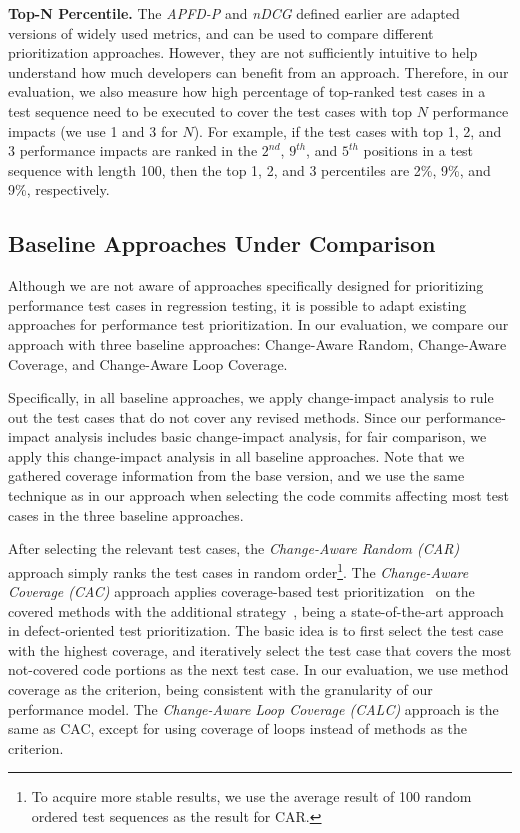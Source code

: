



\textbf{Top-N Percentile.} The \textit{APFD-P} and \textit{nDCG} defined earlier are adapted versions of widely used metrics, and can be used to compare different prioritization approaches. However, they are not sufficiently intuitive to help understand how much developers can benefit from an approach. Therefore, in our evaluation, we also measure how high percentage of top-ranked test cases in a test sequence need to be executed to cover the test cases with top $N$ performance impacts (we use 1 and 3 for $N$). For example, if the test cases with top 1, 2, and 3 performance impacts are ranked in the $2^{nd}$, $9^{th}$, and $5^{th}$ positions in a test sequence with length 100, then the top 1, 2, and 3 percentiles are 2\%, 9\%, and 9\%, respectively. 

\subsection{Baseline Approaches Under Comparison}

Although we are not aware of approaches specifically designed for prioritizing performance test cases in regression testing, it is possible to adapt existing approaches for performance test prioritization. In our evaluation, we compare our approach with three baseline approaches: Change-Aware Random, Change-Aware Coverage, and Change-Aware Loop Coverage.

Specifically, in all baseline approaches, we apply change-impact analysis to rule out the test cases that do not cover any revised methods. Since our performance-impact analysis includes basic change-impact analysis, for fair comparison, we apply this change-impact analysis in all baseline approaches. Note that we gathered coverage information from the base version, and we use the same technique as in our approach when selecting the code commits affecting most test cases in the three baseline approaches. 

After selecting the relevant test cases, the \textit{Change-Aware Random (CAR)} approach simply ranks the test cases in random order\footnote{To acquire more stable results, we use the average result of 100 random ordered test sequences as the result for CAR.}. The \textit{Change-Aware Coverage (CAC)} approach applies coverage-based test prioritization~\cite{covtestprior} on the covered methods with the additional strategy~\cite{additionalTestPrior}, being a state-of-the-art approach in defect-oriented test prioritization. The basic idea is to first select the test case with the highest coverage, and iteratively select the test case that covers the most not-covered code portions as the next test case. In our evaluation, we use method coverage as the criterion, being consistent with the granularity of our performance model. The \textit{Change-Aware Loop Coverage (CALC)} approach is the same as CAC, except for using coverage of loops instead of methods as the criterion. 


